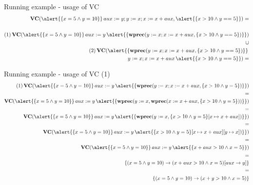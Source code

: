 \documentclass[aspectratio=169]{beamer}
\begin{document}
\begin{slide}{Running example - usage of VC}
\begin{align*}
  \textbf{VC}(\alert{\{x = 5 \land y = 10\}}\,aux := y; y := x; x := x + aux, \alert{\{x > 10 \land y == 5\}}) = \\ \\
  (1)\,\textbf{VC}(\alert{\{x = 5 \land y = 10\}}\,aux := y\,\alert{\{\textbf{wprec}(y := x; x := x + aux, \{x > 10 \land y == 5\})\}})\\
  \cup \\
  (2)\,\textbf{VC}(\alert{\{\textbf{wprec}(y := x; x := x + aux, \{x > 10 \land y == 5\})\}}\,\\y := x; x := x + aux\,\alert{\{x > 10 \land y == 5\}}) =
\end{align*}  
\end{slide}

\begin{slide}{Running example - usage of VC (1)}
\footnotesize{
\begin{align*}
(1)\,\textbf{VC}(\alert{\{x = 5 \land y = 10\}}\,
 aux := y\,
\alert{\{\textbf{wprec}(y := x; x := x + aux, \{x > 10 \land y = 5\})\}})  \\ = \\
\textbf{VC}(\alert{\{x = 5 \land y = 10\}}\,
 aux := y\,
\alert{\{\textbf{wprec}(y := x,\textbf{wprec}(x := x + aux, \{x > 10 \land y = 5\}))\}}) \\ = \\
\textbf{VC}(\alert{\{x = 5 \land y = 10\}}\,
 aux := y\,
 \alert{\{\textbf{wprec}(y := x,\{x > 10 \land y = 5\}[x \mapsto x + aux])\}}) \\ = \\
\textbf{VC}(\alert{\{x = 5 \land y = 10\}}\,
aux := y\,
\alert{\{x > 10 \land y = 5\}[x \mapsto x + aux][y \mapsto x])\}}) \\ = \\
\textbf{VC}(\alert{\{x = 5 \land y = 10\}}\,
aux := y\,
\alert{\{x + aux > 10 \land x = 5\}}) \\ = \\
\{(x = 5 \land y = 10) \to (x + aux > 10 \land x = 5)[aux \to y]\} \\ = \\
\{(x = 5 \land y = 10) \to (x + y > 10 \land x = 5)\}
\end{align*} 
}
\end{slide}
\end{document}
